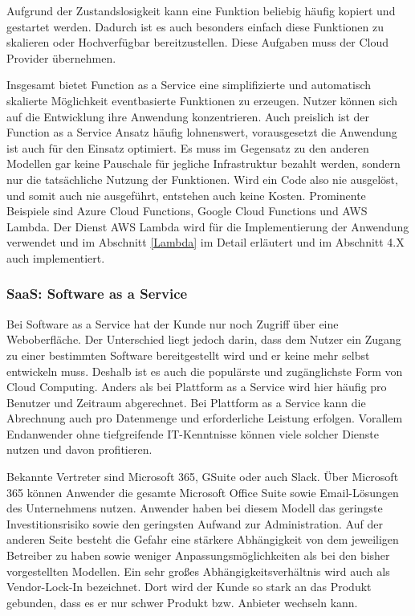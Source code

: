    Aufgrund der Zustandslosigkeit kann eine Funktion beliebig häufig kopiert und gestartet werden.
   Dadurch ist es auch besonders einfach diese Funktionen zu skalieren oder Hochverfügbar bereitzustellen.
   Diese Aufgaben muss der Cloud Provider übernehmen.

   Insgesamt bietet Function as a Service eine simplifizierte und automatisch skalierte Möglichkeit eventbasierte Funktionen zu erzeugen.
   Nutzer können sich auf die Entwicklung ihre Anwendung konzentrieren.
   Auch preislich ist der Function as a Service Ansatz häufig lohnenswert, vorausgesetzt die Anwendung ist auch für den Einsatz optimiert.
   Es muss im Gegensatz zu den anderen Modellen gar keine Pauschale für
   jegliche Infrastruktur bezahlt werden, sondern nur die tatsächliche Nutzung der Funktionen. Wird ein Code also nie ausgelöst, und somit auch nie ausgeführt,
   entstehen auch keine Kosten.
   Prominente Beispiele sind Azure Cloud Functions, Google Cloud Functions und AWS Lambda.
   Der Dienst AWS Lambda wird für die Implementierung der Anwendung verwendet und im Abschnitt \ref{Lambda}  im Detail erläutert und im Abschnitt 4.X auch
   implementiert.\cite[]{LambdaZitat}

   \subsubsection{SaaS: Software as a Service}
   Bei Software as a Service hat der Kunde nur noch Zugriff über eine Weboberfläche.
   Der Unterschied liegt jedoch darin, dass dem Nutzer ein Zugang zu einer bestimmten Software bereitgestellt wird und er keine mehr selbst entwickeln muss.
   Deshalb ist es auch die populärste und zugänglichste Form von Cloud Computing.
   Anders als bei Plattform as a Service wird hier häufig pro Benutzer und Zeitraum abgerechnet.
   Bei Plattform as a Service kann die Abrechnung auch pro Datenmenge und erforderliche Leistung erfolgen.
   Vorallem Endanwender ohne tiefgreifende IT-Kenntnisse können viele solcher Dienste nutzen und davon profitieren. \cite[]{SaaS}

   Bekannte Vertreter sind Microsoft 365, GSuite oder auch Slack.
   Über Microsoft 365 können Anwender die gesamte Microsoft Office Suite sowie Email-Lösungen des Unternehmens nutzen.
   Anwender haben bei diesem Modell das geringste Investitionsrisiko sowie den geringsten Aufwand zur Administration.
   Auf der anderen Seite besteht die Gefahr eine stärkere Abhängigkeit von dem jeweiligen Betreiber zu haben sowie weniger Anpassungsmöglichkeiten als bei den bisher vorgestellten Modellen.
   Ein sehr großes Abhängigkeitsverhältnis wird auch als Vendor-Lock-In bezeichnet. Dort wird der Kunde so stark an das Produkt gebunden, dass es er nur schwer Produkt bzw. Anbieter wechseln kann.



